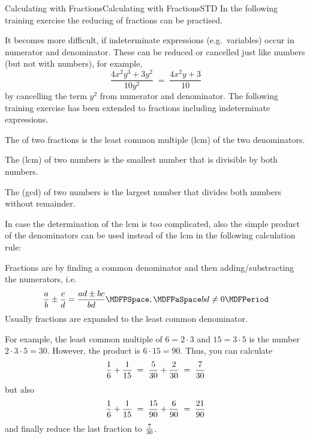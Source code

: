 \begin{MXContent}{Calculating with Fractions}{Calculating with Fractions}{STD}
In the following training exercise the reducing of fractions can be practised.

\newpage

It becomes more difficult, if indeterminate expressions (e.g.\ variables) occur in 
numerator and denominator. These can be reduced or cancelled just like numbers (but not 
with numbers), for example,
$$
\frac{4x^2y^3+3y^2}{10y^2} \;=\; \frac{4x^2y+3}{10}
$$
by cancelling the term $y^2$ from numerator and denominator. The following training exercise
has been extended to fractions including indeterminate expressions.



\begin{MInfo}
The  of two fractions
is the least common multiple (lcm) of the two denominators.

The  (lcm) of two numbers is the smallest number that 
is divisible by both numbers.

The  (gcd) of two numbers is the largest number that
divides both numbers without remainder.
\end{MInfo}

In case the determination of the lcm is too complicated, also the 
simple product of the denominators can be used instead of the lcm in the following 
calculation rule:


\begin{MInfo}
Fractions are  by finding
a common denominator and then adding/substrac\-ting the numerators, i.e.
$$\Mdfrac{a}{b} \pm \Mdfrac{c}{d} = \Mdfrac{a d\pm b c}{b d} \MDFPSpace, \MDFPaSpace b d\neq 0 \MDFPeriod$$
Usually fractions are expanded to the least common denominator.
\end{MInfo}

For example, the least common multiple of $6=2\cdot 3$ and $15=3\cdot 5$ is the number 
$2\cdot3\cdot 5=30$. However, the product is $6\cdot 15=90$. Thus, you can calculate
$$
\dfrac{1}{6}+\dfrac{1}{15} \;=\; \dfrac{5}{30}+\dfrac{2}{30} \;=\; \dfrac{7}{30}
$$
but also
$$
\dfrac{1}{6}+\dfrac{1}{15} \;=\; \dfrac{15}{90}+\dfrac{6}{90} \;=\; \dfrac{21}{90}
$$
and finally reduce the last fraction to $\tfrac{7}{30}$.


\end{MXContent}
